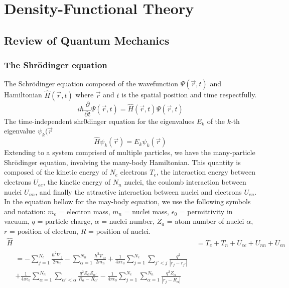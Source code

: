 \chapter{Density-Functional Theory}
\label{sec:DFT}

\section{Review of Quantum Mechanics}

\subsection{The Shr\"{o}dinger equation}
The Schr\"{o}dinger equation composed of the wavefunction $\Psi(\vec{r},t)$ and Hamiltonian $\hat{H}(\vec{r},t)$ where $\vec{r}$ and $t$ is the spatial position and time respectfully.
\begin{equation}
    i\hbar\frac{\partial}{\partial t}\Psi(\vec{r}, t) = \hat{H}(\vec{r},t)\Psi(\vec{r}, t)
\end{equation}
The time-independent shr\"{0}dinger equation for the eigenvalues $E_k$ of the $k$-th eigenvalue $\psi_k(\vec{r}$
\begin{equation}
    \hat{H}\psi_k(\vec{r}) = E_k \psi_k(\vec{r})
\end{equation}
Extending to a system comprised of multiple particles, we have the many-particle Shr\"{o}dinger equation, involving the many-body Hamiltonian. This quantity is composed of the kinetic energy of $N_e$ electrons $T_e$, the interaction energy between electrons $U_{ee}$, the kinetic energy of $N_n$ nuclei, the coulomb interaction between nuclei $U_{nn}$, and finally the attractive interaction between nuclei and electrons $U_{en}$. In the equation bellow for the may-body equation, we use the following symbols and notation: $m_e$ = electron mass, $m_n$ = nuclei mass, $\epsilon_0$ = permittivity in vacuum, $q$ = particle charge, $\alpha$ = nuclei number, $Z_a$ = atom number of nuclei $\alpha$, $r$ = position of electron, $R$ = position of nuclei.
\begin{align}
    \hat{H} &= T_e + T_n + U_{ee} + U_{nn} + U_{en} \\
    \begin{split}
        &= -\sum_{j=1}^{N_e}\frac{\hbar^2\nabla_j}{2m_e} - \sum_{\alpha=1}^{N_n}\frac{\hbar^2 \nabla_\alpha}{2m_n} + \frac{1}{4\pi \epsilon_0}\sum_{j=1}^{N_e}\sum_{j'<j}\frac{q^2}{|r_j - r_{j'}|} \\
    &+ \frac{1}{4\pi\epsilon_0}\sum_{\alpha=1}^{N_n}\sum_{\alpha' < \alpha}\frac{q^2Z_\alpha Z_{\alpha'}}{R_\alpha - R_{\alpha'}} - \frac{1}{4\pi\epsilon_0}\sum_{j=1}^{N_e}\sum_{\alpha=1}^{N_n}\frac{q^2Z_\alpha}{|r_j - R_\alpha|}
    \end{split}
\end{align} 

